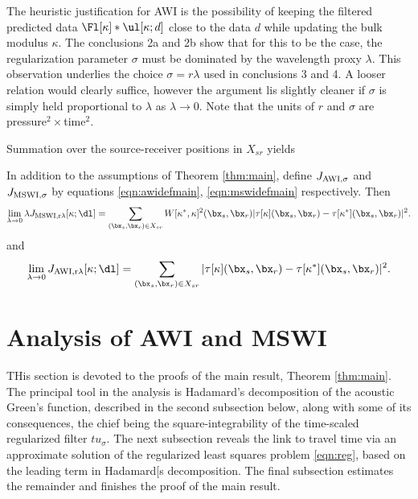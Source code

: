  The heuristic justification for AWI is the possibility of keeping the
filtered predicted data $\Fl[\kappa]*\ul[\kappa;d]$ close to the data
$d$ while updating the bulk modulus $\kappa$. The conclusions 2a and
2b show that for this to be the case, the regularization parameter $\sigma$
must be dominated by the wavelength proxy $\lambda$. This observation underlies the choice
$\sigma = r\lambda$ used in conclusions 3 and 4. A looser relation
would clearly suffice, however the argument lis slightly cleaner if
$\sigma$ is simply held proportional to $\lambda$ as $\lambda
\rightarrow 0$. Note that the units of $r$ and $\sigma$ are pressure$^2 \times$time$^2$.

Summation over the source-receiver positions in $X_{sr}$ yields
\begin{cor}
  \label{thm:cor1}
  In addition to the assumptions of Theorem \ref{thm:main}, define $J_{\rm
    AWI,\sigma}$ and $J_{\rm MSWI,\sigma}$ by equations
  \ref{eqn:awidefmain}, \ref{eqn:mswidefmain} respectively. Then
\begin{equation}
\label{eqn:cor1mswi}   
\lim_{\lambda \rightarrow 0} \lambda J_{\rm MSWI,r\lambda}[\kappa;\dl]
= \sum_{(\bx_s,\bx_r) \in X_{sr}} W[\kappa^*,\kappa]^2(\bx_s,\bx_r) |\tau[\kappa](\bx_s,\bx_r) - \tau[\kappa^*](\bx_s,\bx_r)|^2.
\end{equation}
and
\begin{equation}
\label{eqn:cor1awi}   
\lim_{\lambda \rightarrow 0} J_{\rm AWI,r\lambda}[\kappa;\dl]
= \sum_{(\bx_s,\bx_r) \in X_{sr}}  |\tau[\kappa](\bx_s,\bx_r) - \tau[\kappa^*](\bx_s,\bx_r)|^2.
\end{equation}
\end{cor}

\section{Analysis of AWI and MSWI}
THis section is devoted to the proofs of the main result, Theorem
\ref{thm:main}.  The principal tool in the analysis is Hadamard's
decomposition of the acoustic Green's function, described in the
second
subsection below, along with some of its consequences, the chief being the
square-integrability of the time-scaled regularized filter
$tu_{\sigma}$. The next subsection reveals the link to travel time via
an approximate solution of the regularized least squares problem
\ref{eqn:reg}, based on the leading term in Hadamard[s decomposition.
The final subsection estimates the remainder and finishes the proof of
the main result.

